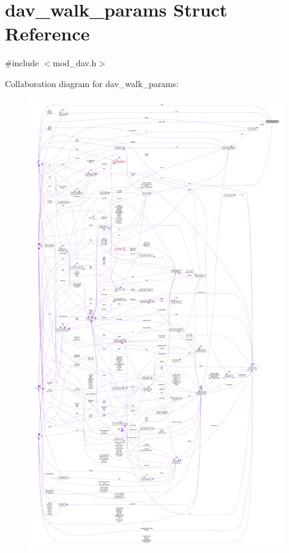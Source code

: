 \hypertarget{structdav__walk__params}{}\section{dav\+\_\+walk\+\_\+params Struct Reference}
\label{structdav__walk__params}


{\ttfamily \#include $<$mod\+\_\+dav.\+h$>$}



Collaboration diagram for dav\+\_\+walk\+\_\+params\+:
\nopagebreak
\begin{figure}[H]
\begin{center}
\leavevmode
\includegraphics[height=550pt]{structdav__walk__params__coll__graph}
\end{center}
\end{figure}
